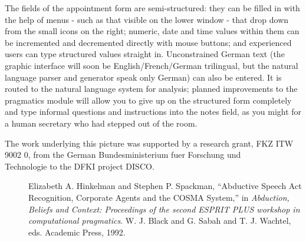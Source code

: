 The fields of the appointment form are semi-structured: they can
be filled in with the help of menus - such as that visible on the lower
window - that drop down from the small icons on the right; numeric, date
and time values within them can be incremented and decremented directly
with mouse buttons; and experienced users can type structured values
straight in.  Unconstrained German text (the graphic interface will soon
be English/French/German trilingual, but the natural language parser and
generator speak only German) can also be entered. It is routed to the
natural language system for analysis; planned improvements to the
pragmatics module will allow you to give up on the structured form
completely and type informal questions and instructions into the notes
field, as you might for a human secretary who had stepped out of the
room.
\begin{tabular}
The work underlying this picture was supported by a research grant, FKZ ITW\\
9002 0, from the German Bundesministerium fuer Forschung und\\
Technologie to the DFKI project DISCO.\\
\end{tabular}
\begin{description}
\item[] Elizabeth A. Hinkelman and Stephen P. Spackman,
``Abductive Speech Act Recognition, Corporate Agents and the COSMA System,''
in {\it Abduction, Beliefs and Context: Proceedings of the second ESPRIT
PLUS workshop in computational pragmatics}.  W. J. Black and G. Sabah
and T. J. Wachtel, eds. Academic Press, 1992.
\end{description}


